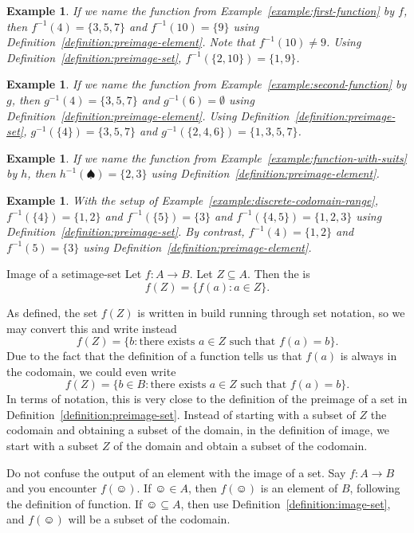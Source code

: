 \documentclass{book}
\newcounter{ekcounter}%
\theoremstyle{ekimcustom}
\newtheorem{example}[ekcounter]{Example}
\newcommand\defn[1]{{\color{blue}{\bf #1}}}
\begin{document}
\begin{example}
If we name the function from Example~\ref{example:first-function} by $f$, then $f^{-1}(4) = \{3,5,7\}$ and $f^{-1}(10)=\{9\}$ using Definition~\ref{definition:preimage-element}. Note that $f^{-1}(10) \not= 9$. Using Definition~\ref{definition:preimage-set}, $f^{-1}(\{2,10\})=\{1,9\}$.
\end{example}
\begin{example}
If we name the function from Example~\ref{example:second-function} by $g$, then $g^{-1}(4) = \{3,5,7\}$ and $g^{-1}(6) = \emptyset$ using Definition~\ref{definition:preimage-element}. Using Definition~\ref{definition:preimage-set}, $g^{-1}(\{4\}) = \{3,5,7\}$ and $g^{-1}(\{2,4,6\}) = \{1,3,5,7\}$.
\end{example}
\begin{example}
If we name the function from Example~\ref{example:function-with-suits} by $h$, then $h^{-1}(\spadesuit) = \{2,3\}$ using Definition~\ref{definition:preimage-element}. 
\end{example}
\begin{example}
With the setup of Example~\ref{example:discrete-codomain-range}, 
$f^{-1}(\{4\}) = \{1,2\}$ and $f^{-1}(\{5\})=\{3\}$ and $f^{-1}(\{4,5\}) = \{1,2,3\}$ using Definition~\ref{definition:preimage-set}.
By contrast, $f^{-1}(4) = \{1,2\}$ and $f^{-1}(5)=\{3\}$ using Definition~\ref{definition:preimage-element}.
\end{example}

\begin{bdefinition}{Image of a set}{image-set}
Let $f : A \to B$. Let $Z \subseteq A$. Then the \defn{image of $Z$} is
\[ f(Z) = \{ f(a) : a \in Z \}.\]
\end{bdefinition}
As defined, the set $f(Z)$ is written in build running through set notation, so we may convert this and write instead
\[ f(Z) = \{ b : \text{there exists } a \in Z \text{ such that } f(a)=b\}.\]
Due to the fact that the definition of a function tells us that $f(a)$ is always in the codomain, we could even write
\[ f(Z) = \{ b \in B : \text{there exists } a \in Z \text{ such that } f(a)=b\}.\]
In terms of notation, this is very close to the definition of the preimage of a set in Definition~\ref{definition:preimage-set}. Instead of starting with a subset of $Z$ the codomain and obtaining a subset of the domain, in the definition of image, we start with a subset $Z$ of the domain and obtain a subset of the codomain.
\begin{bwarning}{}{}
Do not confuse the output of an element with the image of a set. Say $f: A \to B$ and you encounter $f(\smiley)$. If $\smiley \in A$, then $f(\smiley)$ is an element of $B$, following the definition of function. If $\smiley \subseteq A$, then use Definition~\ref{definition:image-set}, and $f(\smiley)$ will be a subset of the codomain.
\end{bwarning}
\end{document}
